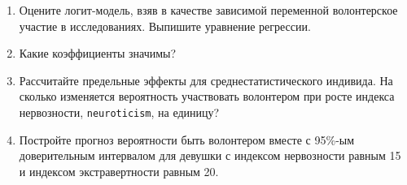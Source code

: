 \documentclass[12pt,a4paper]{article}
\begin{document}
\begin{enumerate}
\begin{enumerate}
\item Оцените логит-модель, взяв в качестве зависимой переменной волонтерское участие в исследованиях. Выпишите уравнение регрессии.
\item Какие коэффициенты значимы?
\item Рассчитайте предельные эффекты для среднестатистического индивида. На сколько изменяется  вероятность участвовать волонтером при росте индекса нервозности, \verb|neuroticism|, на единицу?
\item Постройте прогноз вероятности быть волонтером вместе с 95\%-ым доверительным интервалом для девушки с индексом нервозности равным 15 и индексом экстравертности равным 20.
\end{enumerate}



\end{enumerate}
\end{document}
